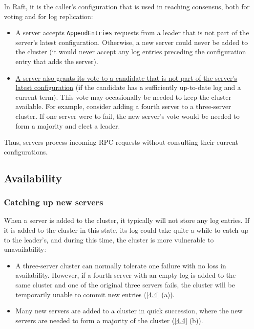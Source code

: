 \documentclass[11pt]{article}
\begin{document}
In Raft, it is the caller’s configuration that is used in reaching consensus, both for voting and for log replication:
\begin{itemize}
\item A server accepts \texttt{AppendEntries} requests from a leader that is not part of the server’s latest
configuration. Otherwise, a new server could never be added to the cluster (it would never accept any log entries preceding the configuration entry that adds the server).
\item \uline{A server also grants its vote to a candidate that is not part of the server’s latest configuration}
(if the candidate has a sufficiently up-to-date log and a current term). This vote may occasionally
be needed to keep the cluster available. For example, consider adding a fourth server to a
three-server cluster. If one server were to fail, the new server’s vote would be needed to form a
majority and elect a leader.
\end{itemize}

Thus, servers process incoming RPC requests without consulting their current configurations.
\subsection{Availability}
\label{sec:orgc76fa2f}
\subsubsection{Catching up new servers}
\label{sec:org944db65}
When a server is added to the cluster, it typically will not store any log entries. If it is added to
the cluster in this state, its log could take quite a while to catch up to the leader’s, and during
this time, the cluster is more vulnerable to unavailability:
\begin{itemize}
\item A three-server cluster can normally tolerate one failure with no loss in availability. However, if a
fourth server with an empty log is added to the same cluster and one of the original three servers
fails, the cluster will be temporarily unable to commit new entries (\ref{4.4} (a)).
\item Many new servers are added to a cluster in quick succession, where the new servers are needed to
form a majority of the cluster (\ref{4.4} (b)).
\end{itemize}
\end{document}
